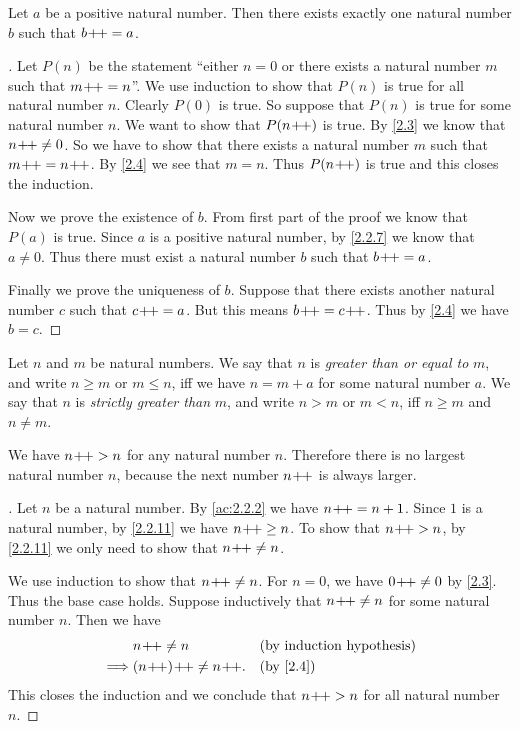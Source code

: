 \begin{lem}\label{2.2.10}
  Let \(a\) be a positive natural number.
  Then there exists exactly one natural number \(b\) such that \(b\!+\!\!+ = a\).
\end{lem}

\begin{proof}[]
  Let \(P(n)\) be the statement ``either \(n = 0\) or there exists a natural number \(m\) such that \(m\!+\!\!+ = n\)''.
  We use induction to show that \(P(n)\) is true for all natural number \(n\).
  Clearly \(P(0)\) is true.
  So suppose that \(P(n)\) is true for some natural number \(n\).
  We want to show that \(P(n\!+\!\!+)\) is true.
  By \cref{2.3} we know that \(n\!+\!\!+ \neq 0\).
  So we have to show that there exists a natural number \(m\) such that \(m\!+\!\!+ = n\!+\!\!+\).
  By \cref{2.4} we see that \(m = n\).
  Thus \(P(n\!+\!\!+)\) is true and this closes the induction.

  Now we prove the existence of \(b\).
  From first part of the proof we know that \(P(a)\) is true.
  Since \(a\) is a positive natural number, by \cref{2.2.7} we know that \(a \neq 0\).
  Thus there must exist a natural number \(b\) such that \(b\!+\!\!+ = a\).

  Finally we prove the uniqueness of \(b\).
  Suppose that there exists another natural number \(c\) such that \(c\!+\!\!+ = a\).
  But this means \(b\!+\!\!+ = c\!+\!\!+\).
  Thus by \cref{2.4} we have \(b = c\).
\end{proof}

\begin{defn}\label{2.2.11}
  Let \(n\) and \(m\) be natural numbers.
  We say that \(n\) is \emph{greater than or equal to} \(m\), and write \(n \geq m\) or \(m \leq n\), iff we have \(n = m + a\) for some natural number \(a\).
  We say that \(n\) is \emph{strictly greater than} \(m\), and write \(n > m\) or \(m < n\), iff \(n \geq m\) and \(n \neq m\).
\end{defn}

\begin{ac}\label{ac:2.2.3}
  We have \(n\!+\!\!+ > n\) for any natural number \(n\).
  Therefore there is no largest natural number \(n\), because the next number \(n\!+\!\!+\) is always larger.
\end{ac}

\begin{proof}[]
  Let \(n\) be a natural number.
  By \cref{ac:2.2.2} we have \(n\!+\!\!+ = n + 1\).
  Since \(1\) is a natural number, by \cref{2.2.11} we have \(n\!+\!\!+ \geq n\).
  To show that \(n\!+\!\!+ > n\), by \cref{2.2.11} we only need to show that \(n\!+\!\!+ \neq n\).

  We use induction to show that \(n\!+\!\!+ \neq n\).
  For \(n = 0\), we have \(0\!+\!\!+ \neq 0\) by \cref{2.3}.
  Thus the base case holds.
  Suppose inductively that \(n\!+\!\!+ \neq n\) for some natural number \(n\).
  Then we have
  \begin{align*}
             & n\pp \neq n          &  & \byIH    \\
    \implies & (n\pp)\pp \neq n\pp. &  & \by{2.4}
  \end{align*}
  This closes the induction and we conclude that \(n\!+\!\!+ > n\) for all natural number \(n\).
\end{proof}

